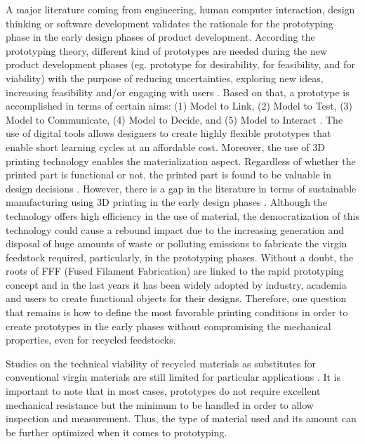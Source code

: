\documentclass[]{interact}
\theoremstyle{plain}%
\theoremstyle{definition}
\theoremstyle{remark}
\begin{document}
A major literature coming from engineering, human computer interaction,
design thinking or software development \citep{Elverum2016a} validates
the rationale for the prototyping phase in the early design phases of
product development. According the prototyping theory, different kind of
prototypes are needed during the new product development phases (eg.
prototype for desirability, for feasibility, and for viability)
\citep{Menold2017} with the purpose of reducing uncertainties, exploring
new ideas, increasing feasibility and/or engaging with users
\citep{Hansen2020}. Based on that, a prototype is accomplished in terms
of certain aims: (1) Model to Link, (2) Model to Test, (3) Model to
Communicate, (4) Model to Decide, and (5) Model to Interact
\citep{Menold2017}. The use of digital tools allows designers to create
highly flexible prototypes that enable short learning cycles at an
affordable cost. Moreover, the use of 3D printing technology enables the
materialization aspect. Regardless of whether the printed part is
functional or not, the printed part is found to be valuable in design
decisions \citep{Elverum2016}. However, there is a gap in the literature
in terms of sustainable manufacturing using 3D printing in the early
design phases \citep{Peng2018}. Although the technology offers high
efficiency in the use of material, the democratization of this
technology could cause a rebound impact due to the increasing generation
and disposal of huge amounts of waste or polluting emissions to
fabricate the virgin feedstock required, particularly, in the
prototyping phases. Without a doubt, the roots of FFF (Fused Filament
Fabrication) are linked to the rapid prototyping concept
\citep{Campbell2012, Bourell2009} and in the last years it has been
widely adopted by industry, academia and users to create functional
objects for their designs. Therefore, one question that remains is how
to define the most favorable printing conditions in order to create
prototypes in the early phases without compromising the mechanical
properties, even for recycled feedstocks.

Studies on the technical viability of recycled materials as substitutes
for conventional virgin materials are still limited for particular
applications \citep{CruzSanchez2020}. It is important to note that in
most cases, prototypes do not require excellent mechanical resistance
but the minimum to be handled in order to allow inspection and
measurement. Thus, the type of material used and its amount can be
further optimized when it comes to prototyping.
\end{document}
